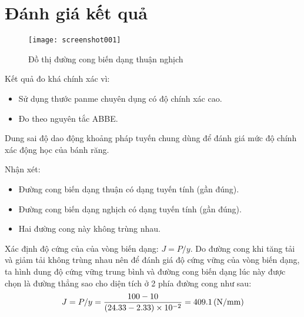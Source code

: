 \section{Đánh giá kết quả}
\begin{figure}[ht]
	\centering
	\texttt{[image: screenshot001]}
	\caption{Đồ thị đường cong biến dạng thuận nghịch}
\end{figure}
Kết quả đo khá chính xác vì:
\begin{itemize}
	\item Sử dụng thước panme chuyên dụng có độ chính xác cao.
	\item Đo theo nguyên tắc ABBE.
\end{itemize}
Dung sai độ dao động khoảng pháp tuyến chung dùng để đánh giá mức độ chính xác động học của bánh răng.

Nhận xét:
\begin{itemize}
	\item Đường cong biến dạng thuận có dạng tuyến tính (gần đúng).
	\item Đường cong biến dạng nghịch có dạng tuyến tính (gần đúng).
	\item Hai đường cong này không trùng nhau.
\end{itemize}

Xác định độ cứng của của vòng biến dạng: $ J = P/y $. Do đường cong khi tăng tải và giảm tải không trùng nhau nên để đánh giá độ cứng vững của vòng biến dạng, ta hình dung độ cứng vững trung bình và đường cong biến dạng lúc này được chọn là đường thẳng sao cho diện tích ở 2 phía đường cong như sau:
\[
J = P/y = \dfrac{100-10}{(24.33-2.33)\times 10^{-2}} = 409.1 \, (\mathrm{N/mm})
\]